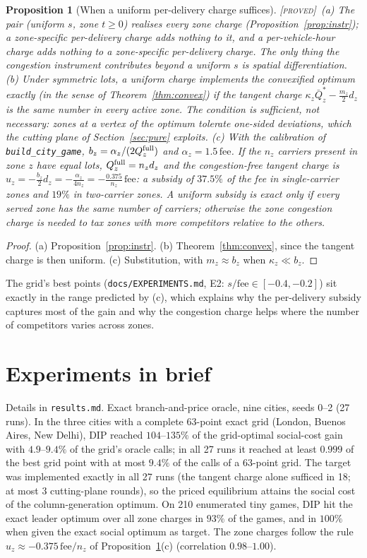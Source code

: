\documentclass[11pt]{article}
\newtheorem{proposition}[theorem]{Proposition}
\theoremstyle{definition}
\theoremstyle{remark}
\newcommand{\Qbar}{\bar Q}
\newcommand{\PROVED}{{\normalfont\textsc{[proved]}}}
\begin{document}
\begin{proposition}[When a uniform per-delivery charge suffices]\label{prop:uniform}\PROVED\
(a) The pair (uniform $s$, zone $t\ge0$) realises every zone charge (Proposition~\ref{prop:instr}); a zone-specific per-delivery charge adds nothing to it, and a per-vehicle-hour charge adds nothing to a zone-specific per-delivery charge. The only thing the congestion instrument contributes beyond a uniform $s$ is spatial differentiation.
(b) Under symmetric lots, a uniform charge implements the convexified optimum exactly (in the sense of Theorem~\ref{thm:convex}) if the tangent charge $\kappa_z\Qbar^*_z-\tfrac{m_z}{2}d_z$ is the same number in every active zone. The condition is sufficient, not necessary: zones at a vertex of the optimum tolerate one-sided deviations, which the cutting plane of Section~\ref{sec:pure} exploits.
(c) With the calibration of \texttt{build\_city\_game}, $b_z=\alpha_z/(2Q^{\rm full}_z)$ and $\alpha_z=1.5\,\mathrm{fee}$. If the $n_z$ carriers present in zone $z$ have equal lots, $Q^{\rm full}_z=n_zd_z$ and the congestion-free tangent charge is $u_z=-\tfrac{b_z}{2}d_z=-\tfrac{\alpha_z}{4n_z}=-\tfrac{0.375}{n_z}\,\mathrm{fee}$: a subsidy of $37.5\%$ of the fee in single-carrier zones and $19\%$ in two-carrier zones. A uniform subsidy is exact only if every served zone has the same number of carriers; otherwise the zone congestion charge is needed to tax zones with more competitors relative to the others.
\end{proposition}
\begin{proof}
(a) Proposition~\ref{prop:instr}. (b) Theorem~\ref{thm:convex}, since the tangent charge is then uniform. (c) Substitution, with $m_z\approx b_z$ when $\kappa_z\ll b_z$.
\end{proof}

The grid's best points (\texttt{docs/EXPERIMENTS.md}, E2: $s/\mathrm{fee}\in[-0.4,-0.2]$) sit exactly in the range predicted by (c), which explains why the per-delivery subsidy captures most of the gain and why the congestion charge helps where the number of competitors varies across zones.

\section{Experiments in brief}
Details in \texttt{results.md}. Exact branch-and-price oracle, nine cities, seeds 0--2 (27 runs). In the three cities with a complete 63-point exact grid (London, Buenos Aires, New Delhi), DIP reached $104$--$135\%$ of the grid-optimal social-cost gain with $4.9$--$9.4\%$ of the grid's oracle calls; in all 27 runs it reached at least $0.999$ of the best grid point with at most $9.4\%$ of the calls of a 63-point grid. The target was implemented exactly in all 27 runs (the tangent charge alone sufficed in 18; at most 3 cutting-plane rounds), so the priced equilibrium attains the social cost of the column-generation optimum. On 210 enumerated tiny games, DIP hit the exact leader optimum over all zone charges in $93\%$ of the games, and in $100\%$ when given the exact social optimum as target. The zone charges follow the rule $u_z\approx-0.375\,\mathrm{fee}/n_z$ of Proposition~\ref{prop:uniform}(c) (correlation $0.98$--$1.00$).
\end{document}
